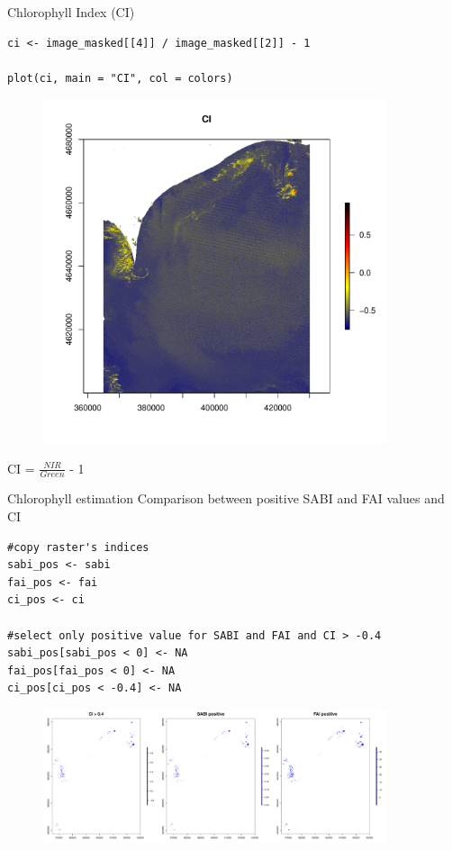 \documentclass[10pt]{beamer}
\begin{document}
\begin{frame}[fragile]{Chlorophyll Index (CI)}
\begin{lstlisting}[firstnumber = 66]
ci <- image_masked[[4]] / image_masked[[2]] - 1

plot(ci, main = "CI", col = colors)    
\end{lstlisting}
 \begin{minipage}{0.6\textwidth}
 \begin{figure}
\centering
\includegraphics[width=0.9\textwidth]{images/ci.pdf} 
\end{figure}
\end{minipage} 
\begin{minipage}[b]{.35\textwidth}
\centering
\Large CI = \Large $\frac{NIR}{Green}$ - 1
\end{minipage}
\end{frame}

\begin{frame}[fragile]{Chlorophyll estimation}
\small Comparison between positive SABI and FAI values and CI
\begin{lstlisting}[firstnumber = 69]
#copy raster's indices
sabi_pos <- sabi
fai_pos <- fai
ci_pos <- ci

#select only positive value for SABI and FAI and CI > -0.4
sabi_pos[sabi_pos < 0] <- NA
fai_pos[fai_pos < 0] <- NA
ci_pos[ci_pos < -0.4] <- NA
\end{lstlisting}
\begin{figure}
    \centering
    \includegraphics[width = 0.9\textwidth]{images/positive.pdf}
\end{figure}
\end{frame}
\end{document}
